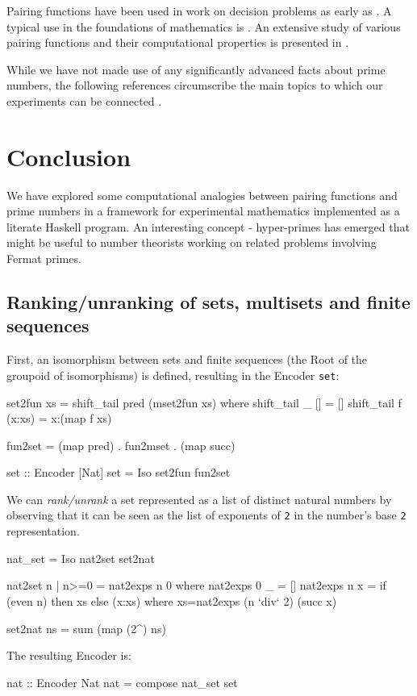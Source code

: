 \documentclass[]{INCLUDES/llncs}
\begin{document}
Pairing functions have been used in work on decision problems as early as
\cite{robinson50,robinsons68b}. A
typical use in the foundations of mathematics is
\cite{DBLP:journals/tcs/CegielskiR01}.
An extensive study of various pairing functions and their 
computational properties is presented in 
\cite{DBLP:conf/ipps/Rosenberg02a}.

While we have not made use of any significantly advanced facts about prime
numbers, the following references circumscribe the 
main topics to which our experiments can be connected
\cite{DBLP:journals/tit/Pippenger05,CP2005,Young98,Riesel85,Keller83,journals/fuin/CegielskiRV07}.


\section{Conclusion} \label{concl}
We have explored some computational analogies
between  pairing functions
and prime numbers in a framework for experimental
mathematics implemented as a literate Haskell
program. An interesting concept - hyper-primes has
emerged that might be useful to
number theorists working on related problems
involving Fermat primes.





 

\subsection*{Ranking/unranking of sets, multisets and finite sequences}
First, an isomorphism between sets and finite sequences (the Root of the
groupoid of isomorphisms) is defined, resulting in the Encoder {\tt set}:
\begin{code}
set2fun xs = shift_tail pred (mset2fun xs) where
  shift_tail _ [] = []
  shift_tail f (x:xs) = x:(map f xs)
  
fun2set = (map pred) . fun2mset . (map succ)

set :: Encoder [Nat]
set = Iso set2fun fun2set
\end{code}

\label{natset} We can {\em rank/unrank} a set represented as a list of distinct
natural numbers by observing that it can be seen
as the list of exponents of {\tt 2} in the number's
base {\tt 2} representation.
\begin{code}
nat_set = Iso nat2set set2nat 

nat2set n | n>=0 = nat2exps n 0 where
  nat2exps 0 _ = []
  nat2exps n x = if (even n) then xs else (x:xs) where
    xs=nat2exps (n `div` 2) (succ x)

set2nat ns = sum (map (2^) ns)
\end{code}
The resulting Encoder is:
\begin{code}
nat :: Encoder Nat
nat = compose nat_set set
\end{code}
\end{document}
